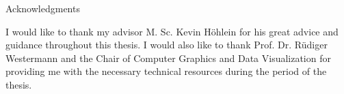 \thispagestyle{empty}

\vspace*{20mm}

\begin{center}
{ Acknowledgments}
\end{center}

\vspace{10mm}

I would like to thank my advisor M. Sc. Kevin Höhlein for his great advice and guidance throughout this thesis. I would also like to thank Prof. Dr. Rüdiger Westermann and the Chair of Computer Graphics and Data Visualization for providing me with the necessary technical resources during the period of the thesis.

\cleardoublepage{}
